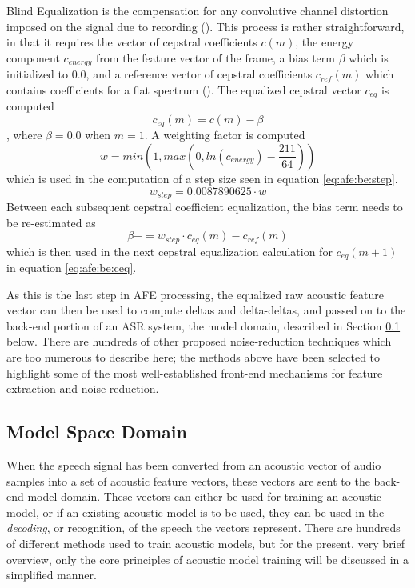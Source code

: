 Blind Equalization is the compensation for any convolutive channel distortion imposed on the signal due to recording (\cite{mauuary:98}).  This process is rather straightforward, in that it requires the vector of cepstral coefficients $c(m)$, the energy component $c_{energy}$ from the feature vector of the frame, a bias term $\beta$ which is initialized to $0.0$, and a reference vector of cepstral coefficients $c_{ref}(m)$ which contains coefficients for a flat spectrum (\cite{etsi:02}).  The equalized cepstral vector $c_{eq}$ is computed \begin{equation}\label{eq:afe:be:ceq} c_{eq}(m) = c(m) - \beta \end{equation}, where $\beta = 0.0$ when $m = 1$.  A weighting factor is computed \begin{equation} w = min( 1 , max( 0 , ln(c_{energy}) - \dfrac{211}{64} ) ) \end{equation} which is used in the computation of a step size seen in equation \ref{eq:afe:be:step}. \begin{equation}\label{eq:afe:be:step} w_{step} = 0.0087890625 \cdot w \end{equation}  Between each subsequent cepstral coefficient equalization, the bias term needs to be re-estimated as \begin{equation} \beta \mathrel{{+}{=}} w_{step} \cdot c_{eq}(m) - c_{ref}(m) \end{equation} which is then used in the next cepstral equalization calculation for $c_{eq}(m+1)$ in equation \ref{eq:afe:be:ceq}.

As this is the last step in AFE processing, the equalized raw acoustic feature vector can then be used to compute deltas and delta-deltas, and passed on to the back-end portion of an ASR system, the model domain, described in Section \ref{sec:model-domain} below.  There are hundreds of other proposed noise-reduction techniques which are too numerous to describe here; the methods above have been selected to highlight some of the most well-established front-end mechanisms for feature extraction and noise reduction.


\subsection{Model Space Domain}\label{sec:model-domain}

When the speech signal has been converted from an acoustic vector of audio samples into a set of acoustic feature vectors, these vectors are sent to the back-end model domain.  These vectors can either be used for training an acoustic model, or if an existing acoustic model is to be used, they can be used in the \textit{decoding}, or recognition, of the speech the vectors represent.  There are hundreds of different methods used to train acoustic models, but for the present, very brief overview, only the core principles of acoustic model training will be discussed in a simplified manner.  

